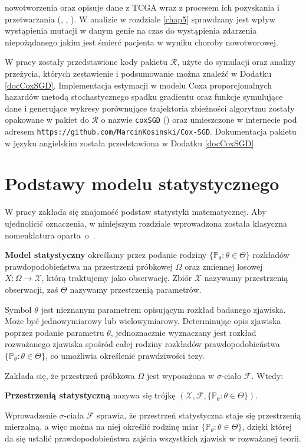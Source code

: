 nowotworzenia oraz opisuje dane z TCGA wraz z procesem ich pozyskania i przetwarzania (\cite{kosa1}, \cite{kosa2}, \cite{kosa3}). W analizie w rozdziale \ref{chap5} sprawdzany jest wpływ wystąpienia mutacji w danym genie na czas do wystąpienia zdarzenia niepożądanego jakim jest śmierć pacjenta w wyniku choroby nowotworowej.

W pracy zostały przedstawione kody pakietu $\mathcal{R}$, użyte do symulacji oraz analizy przeżycia, których zestawienie i podsumowanie można znaleźć w Dodatku \ref{docCoxSGD}. Implementacja estymacji w modelu Coxa proporcjonalnych hazardów metodą stochastycznego spadku gradientu oraz funkcje symulujące dane i generujące wykresy porównujące trajektoria zbieżności algorytmu zostały opakowane w pakiet do $\mathcal{R}$ o nazwie \texttt{coxSGD} (\cite{kosa0}) oraz umieszczone w internecie pod adresem \texttt{https://github.com/MarcinKosinski/Cox-SGD}. Dokumentacja pakietu w języku angielskim została przedstawiona w Dodatku \ref{docCoxSGD}.

\chapter*{Podstawy modelu statystycznego}

W pracy zakłada się znajomość podstaw statystyki matematycznej. Aby ujednolicić oznaczenia, w niniejszym rozdziale wprowadzona została klasyczna nomenklatura oparta~o~\cite{niemiro}.

\begin{definition}
\textbf{Model statystyczny} określamy przez podanie rodziny $\{ \mathbb P_{\theta}:\theta\in\Theta\} $ rozkładów prawdopodobieństwa na przestrzeni próbkowej $\Omega$ oraz zmiennej losowej $X : \Omega \rightarrow \mathcal{X}$, którą traktujemy jako obserwację. Zbiór $\mathcal{X}$ nazywamy przestrzenią obserwacji, zaś $\Theta$ nazywamy przestrzenią parametrów. \\
\end{definition}
Symbol $\theta$ jest nieznanym parametrem opisującym rozkład badanego zjawiska. Może być jednowymiarowy lub wielowymiarowy. Determinując opis zjawiska poprzez podanie parametru $\theta$, jednoznacznie wyznaczany jest rozkład rozważanego zjawiska spośród całej rodziny rozkładów prawdopodobieństwa $\{ \mathbb P_{\theta}:\theta\in\Theta\}$, co umożliwia określenie prawdziwości tezy.
\par
Zakłada się, że przestrzeń próbkowa $\Omega$ jest wyposażona w $\sigma$-ciało $\mathcal{F}$. Wtedy:
\begin{definition}
\textbf{Przestrzenią statystyczną} nazywa się trójkę $(\mathcal{X},\mathcal{F},\{\mathbb P_{\theta}:\theta\in\Theta\})$.
\end{definition}
Wprowadzenie $\sigma$-ciała $\mathcal{F}$ sprawia, że przestrzeń statystyczna staje się przestrzenią mierzalną, a więc można na niej określić rodzinę miar $\{ \mathbb P_{\theta}:\theta\in\Theta\} $, dzięki której da się ustalić prawdopodobieństwa$  $ zajścia wszystkich zjawisk w rozważanej teorii.

